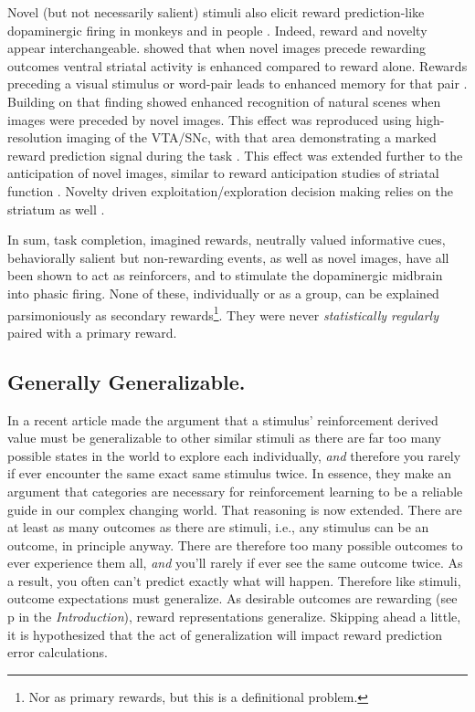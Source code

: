 Novel (but not necessarily salient) stimuli also elicit reward prediction-like dopaminergic firing in monkeys \cite{Blatter:2006p6372} and in people \cite{Bunzeck:2006p5319}. Indeed, reward and novelty appear interchangeable.   showed that when novel images precede rewarding outcomes ventral striatal activity is enhanced compared to reward alone.  Rewards preceding a visual stimulus or word-pair leads to enhanced memory for that pair \cite{Lisman:2005p5455}.  Building on that finding  showed enhanced recognition of natural scenes when images were preceded by novel images.  This effect was reproduced using high-resolution imaging of the VTA/SNc, with that area demonstrating a marked reward prediction signal during the task \cite{Krebs:2011p8134}.  This effect was extended further to the anticipation of novel images, similar to reward anticipation studies of striatal function \cite{Knutson:2001p5234}.  Novelty driven exploitation/exploration decision making relies on the striatum as well \cite{Wittmann:2008p541}.

In sum, task completion, imagined rewards, neutrally valued informative cues, behaviorally salient but non-rewarding events, as well as novel images, have all been shown to act as reinforcers, and to stimulate the dopaminergic midbrain into phasic firing.  None of these, individually or as a group, can be explained parsimoniously as secondary rewards\footnote{
    Nor as primary rewards, but this is a definitional problem.
}.  They were never \emph{statistically regularly} paired with a primary reward.

\subsection{Generally Generalizable.}
\label{sub:gen}
In a recent article  made the argument that a stimulus' reinforcement derived value must be generalizable to other similar stimuli as there are far too many possible states in the world to explore each individually, \emph{and} therefore you rarely if ever encounter the same exact same stimulus twice.  In essence, they make an argument that categories are necessary for reinforcement learning to be a reliable guide in our complex changing world.  That reasoning is now extended.  There are at least as many outcomes as there are stimuli, i.e., any stimulus can be an outcome, in principle anyway. There are therefore too many possible outcomes to ever experience them all, \emph{and} you'll rarely if ever see the same outcome twice.  As a result, you often can't predict exactly what will happen. Therefore like stimuli, outcome expectations must generalize.  As desirable outcomes are rewarding (see p\pageref{sub:cogrew} in the \emph{Introduction}), reward representations generalize.  Skipping ahead a little, it is  hypothesized that the act of generalization will impact reward prediction error calculations.

